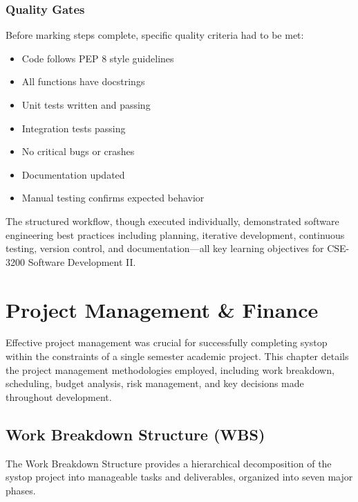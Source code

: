 \documentclass[12pt,a4paper,oneside]{report}
\begin{document}
\subsection{Quality Gates}

Before marking steps complete, specific quality criteria had to be met:
\begin{itemize}
    \item Code follows PEP 8 style guidelines
    \item All functions have docstrings
    \item Unit tests written and passing
    \item Integration tests passing
    \item No critical bugs or crashes
    \item Documentation updated
    \item Manual testing confirms expected behavior
\end{itemize}

The structured workflow, though executed individually, demonstrated software engineering best practices including planning, iterative development, continuous testing, version control, and documentation---all key learning objectives for CSE-3200 Software Development II.

\chapter{Project Management \& Finance}
\label{chap:management}

Effective project management was crucial for successfully completing systop within the constraints of a single semester academic project. This chapter details the project management methodologies employed, including work breakdown, scheduling, budget analysis, risk management, and key decisions made throughout development.

\section{Work Breakdown Structure (WBS)}
\label{sec:wbs}

The Work Breakdown Structure provides a hierarchical decomposition of the systop project into manageable tasks and deliverables, organized into seven major phases.
\end{document}
